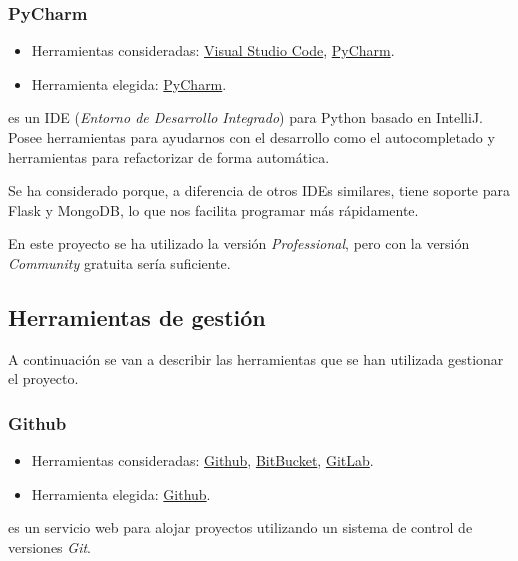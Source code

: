 \subsubsection{PyCharm}

\begin{itemize}
	\tightlist
	\item
	Herramientas consideradas:
	\href{https://code.visualstudio.com/}{Visual Studio Code}, 
	\href{https://www.jetbrains.com/pycharm/}{PyCharm}.
	\item
	Herramienta elegida:
	\href{https://www.jetbrains.com/pycharm/}{PyCharm}.
\end{itemize}

 es un IDE (\textit{Entorno de Desarrollo Integrado}) para Python basado en IntelliJ. Posee herramientas para ayudarnos con el desarrollo como el autocompletado y herramientas para refactorizar de forma automática.

Se ha considerado porque, a diferencia de otros IDEs similares, tiene soporte para Flask y MongoDB, lo que nos facilita programar más rápidamente.

En este proyecto se ha utilizado la versión \textit{Professional}, pero con la versión \textit{Community} gratuita sería suficiente.

\subsection{Herramientas de gestión}

A continuación se van a describir las herramientas que se han utilizada gestionar el proyecto.

\subsubsection{Github} \label{github}

\begin{itemize}
	\tightlist
	\item
	Herramientas consideradas:
	\href{https://github.com/}{Github}, 
	\href{https://bitbucket.org/product}{BitBucket},
	\href{https://about.gitlab.com/}{GitLab}.
	\item
	Herramienta elegida:
	\href{https://github.com/}{Github}.
\end{itemize}

 es un servicio web para alojar proyectos utilizando un sistema de control de versiones \textit{Git}.

